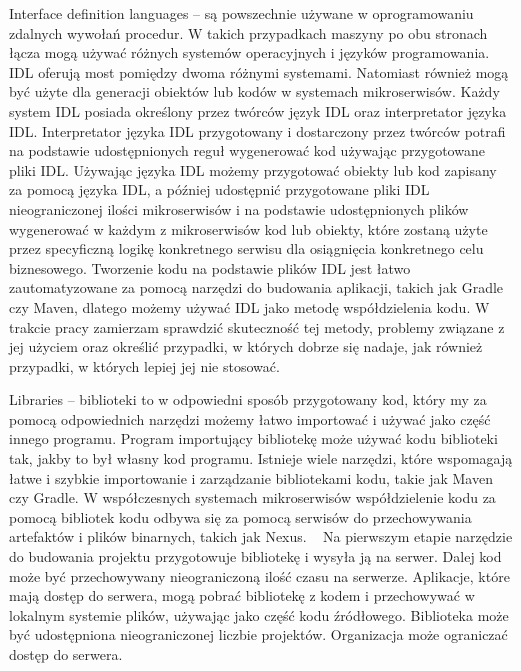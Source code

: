 \documentclass[runningheads,12pt]{llncs}
\begin{document}
Interface definition languages – są powszechnie używane w oprogramowaniu zdalnych wywołań procedur. W takich przypadkach maszyny po obu stronach łącza mogą używać różnych systemów operacyjnych i języków programowania. IDL oferują most pomiędzy dwoma różnymi systemami. Natomiast również mogą być użyte dla generacji obiektów lub kodów w systemach mikroserwisów. Każdy system IDL posiada określony przez twórców język IDL oraz interpretator języka IDL. Interpretator języka IDL przygotowany i dostarczony przez twórców potrafi na podstawie udostępnionych reguł wygenerować kod używając przygotowane pliki IDL. Używając języka IDL możemy przygotować obiekty lub kod zapisany za pomocą języka IDL, a później udostępnić przygotowane pliki IDL nieograniczonej ilości mikroserwisów i na podstawie udostępnionych plików wygenerować w każdym z mikroserwisów kod lub obiekty, które zostaną użyte przez specyficzną logikę konkretnego serwisu dla osiągnięcia konkretnego celu biznesowego. Tworzenie kodu na podstawie plików IDL jest łatwo zautomatyzowane za pomocą narzędzi do budowania aplikacji, takich jak Gradle czy Maven, dlatego możemy używać IDL jako metodę współdzielenia kodu. W trakcie pracy zamierzam sprawdzić skuteczność tej metody, problemy związane z jej użyciem oraz określić przypadki, w których dobrze się nadaje, jak również przypadki, w których lepiej jej nie stosować.

Libraries – biblioteki to w odpowiedni sposób przygotowany kod, który my za pomocą odpowiednich narzędzi możemy łatwo importować i używać jako część innego programu. Program importujący bibliotekę może używać kodu biblioteki tak, jakby to był własny kod programu. Istnieje wiele narzędzi, które wspomagają łatwe i szybkie importowanie i zarządzanie bibliotekami kodu, takie jak Maven czy Gradle. W współczesnych systemach mikroserwisów współdzielenie kodu za pomocą bibliotek kodu odbywa się za pomocą serwisów do przechowywania artefaktów i plików binarnych, takich jak Nexus. ~\cite[5]{labouardy2021pipeline} Na pierwszym etapie narzędzie do budowania projektu przygotowuje bibliotekę i wysyła ją na serwer. Dalej kod może być przechowywany nieograniczoną ilość czasu na serwerze. Aplikacje, które mają dostęp do serwera, mogą pobrać bibliotekę z kodem i przechowywać w lokalnym systemie plików, używając jako część kodu źródłowego. Biblioteka może być udostępniona nieograniczonej liczbie projektów. Organizacja może ograniczać dostęp do serwera.
\end{document}

